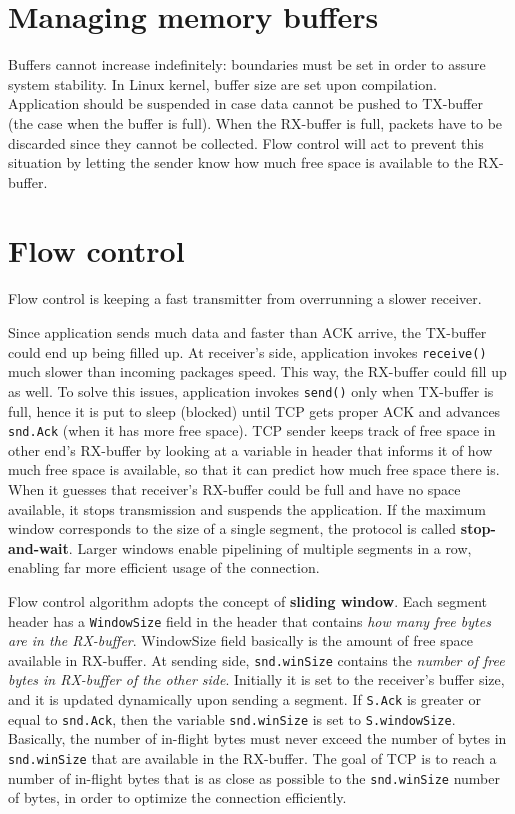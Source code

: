 \documentclass[a4paper, 11pt]{report}
\begin{document}
\section{Managing memory buffers}

Buffers cannot increase indefinitely: boundaries must be set in order to assure
system stability. In Linux kernel, buffer size are set upon compilation.
Application should be suspended in case data cannot be pushed to TX-buffer (the
case when the buffer is full). When the RX-buffer is full, packets have to be
discarded since they cannot be collected. Flow control will act to prevent this
situation by letting the sender know how much free space is available to the
RX-buffer.

\section{Flow control}

Flow control is keeping a fast transmitter from overrunning a slower receiver.

Since application sends much data and faster than ACK arrive, the TX-buffer
could end up being filled up. At receiver's side, application invokes
\texttt{receive()} much slower than incoming packages speed. This way, the
RX-buffer could fill up as well. To solve this issues, application invokes
\texttt{send()} only when TX-buffer is full, hence it is put to sleep (blocked)
until TCP gets proper ACK and advances \texttt{snd.Ack} (when it has more free
space). TCP sender keeps track of free space in other end's RX-buffer by
looking at a variable in header that informs it of how much free space is
available, so that it can predict how much free space there is. When it guesses
that receiver's RX-buffer could be full and have no space available, it stops
transmission and suspends the application. If the maximum window corresponds to
the size of a single segment, the protocol is called \textbf{stop-and-wait}.
Larger windows enable pipelining of multiple segments in a row, enabling far
more efficient usage of the connection.

Flow control algorithm adopts the concept of \textbf{sliding window}. Each
segment header has a \texttt{WindowSize} field in the header that contains
\emph{how many free bytes are in the RX-buffer}. WindowSize field basically is
the amount of free space available in RX-buffer. At sending side,
\texttt{snd.winSize} contains the \emph{number of free bytes in RX-buffer of
the other side}. Initially it is set to the receiver's buffer size, and it is
updated dynamically upon sending a segment. If \texttt{S.Ack} is greater or
equal to \texttt{snd.Ack}, then the variable \texttt{snd.winSize} is set to
\texttt{S.windowSize}. Basically, the number of in-flight bytes must never
exceed the number of bytes in \texttt{snd.winSize} that are available in the
RX-buffer. The goal of TCP is to reach a number of in-flight bytes that is as
close as possible to the \texttt{snd.winSize} number of bytes, in order to
optimize the connection efficiently.
\end{document}
